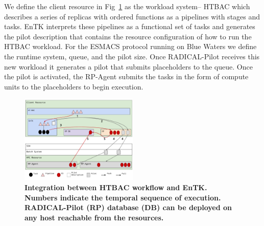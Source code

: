 We define the client resource in Fig~\ref{figure:ht-bac_rp} as the workload system-- HTBAC which describes a series of replicas with ordered functions as a pipelines with stages and tasks. EnTK interprets these pipelines as a functional set of tasks and generates the pilot description that contains the resource configuration of how to run the HTBAC workload. For the ESMACS protocol running on Blue Waters we define the runtime system, queue, and the pilot size. Once RADICAL-Pilot receives this new workload it generates a pilot that submits placeholders to the queue. Once the pilot is activated, the RP-Agent submits the tasks in the form of compute units to the placeholders to begin execution.  


\begin{figure}[ht]
\centering
  \includegraphics[width=0.5\textwidth]{FIGURES/ht-bac-rp_integration.pdf}
  \caption{\bf Integration between HTBAC workflow and EnTK. Numbers indicate the temporal sequence of execution. RADICAL-Pilot (RP) database (DB) can be deployed on any host reachable from the resources.}
   \label{figure:ht-bac_rp}
\end{figure}


